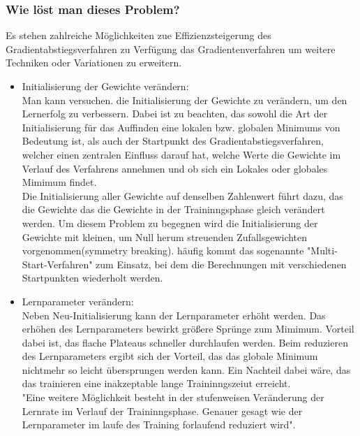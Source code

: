 \subsubsection{Wie löst man dieses Problem?}\label{subsec:gradientenverfahren:fehlerquellen_problem_loesen}
Es stehen zahlreiche Möglichkeiten zue Effizienzsteigerung des Gradientabstiegsverfahren zu Verfügung das Gradientenverfahren um weitere Techniken oder Variationen zu erweitern.
\begin{itemize}
  \item Initialisierung der Gewichte verändern:\\
  Man kann versuchen. die Initialisierung der Gewichte zu verändern, um den Lernerfolg zu verbessern. Dabei ist zu beachten, das sowohl die Art der Initialisierung für das Auffinden eine lokalen bzw. globalen 
  Minimums von Bedeutung ist, als auch der Startpunkt des Gradientabstiegsverfahren, welcher einen zentralen Einfluss darauf hat, welche Werte die Gewichte im Verlauf des Verfahrens annehmen und ob sich ein Lokales
  oder globales Mimimum findet.\\
  Die Initialisierung aller Gewichte auf denselben Zahlenwert führt dazu, das die Gewichte das die Gewichte in der Traininngsphase gleich verändert werden. Um diesem Problem zu begegnen wird die Initialisierung
  der Gewichte mit kleinen, um Null herum streuenden Zufallsgewichten vorgenommen(symmetry breaking). häufig kommt das sogenannte "Multi-Start-Verfahren" zum Einsatz, bei dem die Berechnungen mit verschiedenen
  Startpunkten wiederholt werden. 
\end{itemize}
\begin{itemize}
  \item Lernparameter verändern:\\
  Neben Neu-Initialisierung kann der Lernparameter erhöht werden. Das erhöhen des Lernparameters bewirkt größere Sprünge zum Mimimum. Vorteil dabei ist, das flache Plateaus schneller durchlaufen
  werden. Beim reduzieren des Lernparameters ergibt sich der Vorteil, das das globale Minimum nichtmehr so leicht übersprungen werden kann. Ein Nachteil dabei wäre, das das trainieren eine inakzeptable
  lange Traininngszeiut erreicht.\\
  "Eine weitere Möglichkeit besteht in der stufenweisen Veränderung der Lernrate im Verlauf der Traininngsphase. Genauer gesagt wie der Lernparameter im laufe des Training forlaufend reduziert wird"\cite[Seite 46]{GR10}.\\
\end{itemize}
